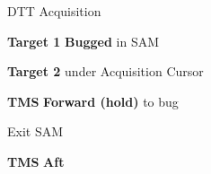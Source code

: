 \begin{tableitemize}
{    DTT Acquisition

    \begin{subenumerate}
        \item \textbf{Target 1} \dotfill \textbf{Bugged} in SAM
        \item \textbf{Target 2} \dotfill under Acquisition Cursor
        \item \textbf{TMS} \dotfill \textbf{Forward (hold)} to bug
    \end{subenumerate}
    
    Exit SAM 
    
    \begin{subenumerate}
        \item \textbf{TMS} \dotfill \textbf{Aft}
    \end{subenumerate}}
\end{tableitemize}




\clearpage

